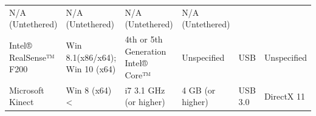 \documentclass[12pt]{article}
\begin{document}
\begin{longtable}[]{@{}llllll@{}}
\begin{minipage}[t]{0.20\columnwidth}
N/A (Untethered)\strut
\end{minipage} & \begin{minipage}[t]{0.10\columnwidth}\raggedright\strut
N/A (Untethered)\strut
\end{minipage} & \begin{minipage}[t]{0.10\columnwidth}\raggedright\strut
N/A (Untethered)\strut
\end{minipage} & \begin{minipage}[t]{0.11\columnwidth}\raggedright\strut
N/A (Untethered)\strut
\end{minipage}\tabularnewline
\begin{minipage}[t]{0.14\columnwidth}\raggedright\strut
Intel® RealSense™ F200\strut
\end{minipage} & \begin{minipage}[t]{0.18\columnwidth}\raggedright\strut
Win 8.1(x86/x64); Win 10 (x64)\strut
\end{minipage} & \begin{minipage}[t]{0.20\columnwidth}\raggedright\strut
4th or 5th Generation Intel® Core™\strut
\end{minipage} & \begin{minipage}[t]{0.10\columnwidth}\raggedright\strut
Unspecified\strut
\end{minipage} & \begin{minipage}[t]{0.10\columnwidth}\raggedright\strut
USB\strut
\end{minipage} & \begin{minipage}[t]{0.11\columnwidth}\raggedright\strut
Unspecified\strut
\end{minipage}\tabularnewline
\begin{minipage}[t]{0.14\columnwidth}\raggedright\strut
Microsoft Kinect\strut
\end{minipage} & \begin{minipage}[t]{0.18\columnwidth}\raggedright\strut
Win 8 (x64) \textless{}\strut
\end{minipage} & \begin{minipage}[t]{0.20\columnwidth}\raggedright\strut
i7 3.1 GHz (or higher)\strut
\end{minipage} & \begin{minipage}[t]{0.10\columnwidth}\raggedright\strut
4 GB (or higher)\strut
\end{minipage} & \begin{minipage}[t]{0.10\columnwidth}\raggedright\strut
USB 3.0\strut
\end{minipage} & \begin{minipage}[t]{0.11\columnwidth}\raggedright\strut
DirectX 11\strut
\end{minipage}\tabularnewline
\bottomrule
\end{longtable}
\end{document}
